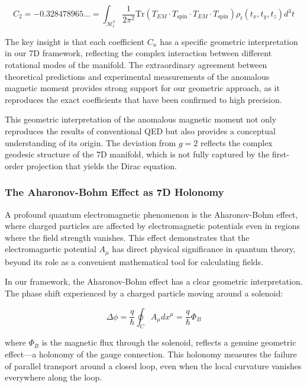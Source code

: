 \documentclass{article}
\begin{document}
\begin{equation}
C_2 = -0.328478965... = \int_{\mathcal{M}^3_t} \frac{1}{2\pi^2} \text{Tr}(T_{EM} \cdot T_{\text{spin}} \cdot T_{EM} \cdot T_{\text{spin}}) \rho_t(t_x, t_y, t_z) d^3t
\end{equation}

The key insight is that each coefficient $C_n$ has a specific geometric interpretation in our 7D framework, reflecting the complex interaction between different rotational modes of the manifold. The extraordinary agreement between theoretical predictions and experimental measurements of the anomalous magnetic moment provides strong support for our geometric approach, as it reproduces the exact coefficients that have been confirmed to high precision.

This geometric interpretation of the anomalous magnetic moment not only reproduces the results of conventional QED but also provides a conceptual understanding of its origin. The deviation from $g = 2$ reflects the complex geodesic structure of the 7D manifold, which is not fully captured by the first-order projection that yields the Dirac equation.

\subsubsection{The Aharonov-Bohm Effect as 7D Holonomy}

A profound quantum electromagnetic phenomenon is the Aharonov-Bohm effect, where charged particles are affected by electromagnetic potentials even in regions where the field strength vanishes. This effect demonstrates that the electromagnetic potential $A_{\mu}$ has direct physical significance in quantum theory, beyond its role as a convenient mathematical tool for calculating fields.

In our framework, the Aharonov-Bohm effect has a clear geometric interpretation. The phase shift experienced by a charged particle moving around a solenoid:

\begin{equation}
\Delta\phi = \frac{q}{\hbar} \oint_C A_{\mu} dx^{\mu} = \frac{q}{\hbar} \Phi_B
\end{equation}

where $\Phi_B$ is the magnetic flux through the solenoid, reflects a genuine geometric effect—a holonomy of the gauge connection. This holonomy measures the failure of parallel transport around a closed loop, even when the local curvature vanishes everywhere along the loop.
\end{document}
